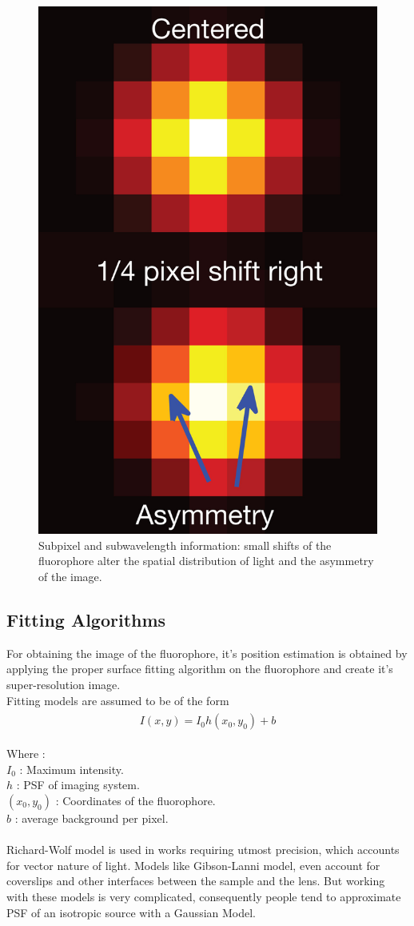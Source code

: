 \documentclass[paper=a4, fontsize=11pt]{scrartcl}
\numberwithin{equation}{section}		%
\numberwithin{figure}{section}			%
\numberwithin{table}{section}				%
\begin{document}
\begin{figure}[h]
\centering
\includegraphics[width=.5\textwidth]{nmeth_2844-F1}
\caption{Subpixel and subwavelength information: small shifts of the fluorophore alter the spatial distribution of light and the asymmetry of the image.}
\end{figure}

\subsection{Fitting Algorithms}
For obtaining the image of the fluorophore, it's position estimation is obtained by applying the proper surface fitting algorithm on the fluorophore and create it's super-resolution image. \\
Fitting models are assumed to be of the form
\begin{align}
	\begin{split}
I (x, y) = I_0 h(x_0,y_0) + b
	\end{split}
\end{align}

Where :\\
$I_0$ : Maximum intensity. \\
$h$ : PSF of imaging system. \\
$(x_0, y_0)$ : Coordinates of the fluorophore. \\
$b$ : average background per pixel. \\ \\

Richard-Wolf model is used in works requiring utmost precision, which accounts for vector nature of light. Models like Gibson-Lanni model, even account for coverslips and other interfaces between the sample and the lens. But working with these models is very complicated, consequently people tend to approximate PSF of an isotropic source with a Gaussian Model.
\end{document}
